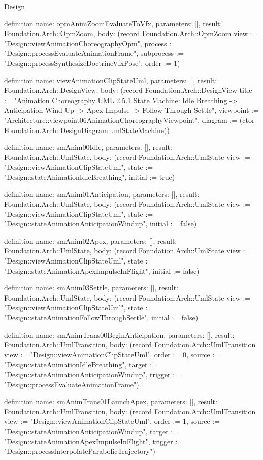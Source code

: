 \begin{lexlean}{Design}
\begin{semanticmodule}
definition{
  name: opmAnimZoomEvaluateToVfx,
  parameters: [],
  result: Foundation.Arch::OpmZoom,
  body: (record Foundation.Arch::OpmZoom {view := "Design::viewAnimationChoreographyOpm", process := "Design::processEvaluateAnimationFrame", subprocess := "Design::processSynthesizeDoctrineVfxPose", order := 1})
}

definition{
  name: viewAnimationClipStateUml,
  parameters: [],
  result: Foundation.Arch::DesignView,
  body: (record Foundation.Arch::DesignView {title := "Animation Choreography UML 2.5.1 State Machine: Idle Breathing -> Anticipation Wind-Up -> Apex Impulse -> Follow-Through Settle", viewpoint := "Architecture::viewpoint06AnimationChoreographyViewpoint", diagram := (ctor Foundation.Arch::DesignDiagram.umlStateMachine)})
}

definition{
  name: smAnim00Idle,
  parameters: [],
  result: Foundation.Arch::UmlState,
  body: (record Foundation.Arch::UmlState {view := "Design::viewAnimationClipStateUml", state := "Design::stateAnimationIdleBreathing", initial := true})
}

definition{
  name: smAnim01Anticipation,
  parameters: [],
  result: Foundation.Arch::UmlState,
  body: (record Foundation.Arch::UmlState {view := "Design::viewAnimationClipStateUml", state := "Design::stateAnimationAnticipationWindup", initial := false})
}

definition{
  name: smAnim02Apex,
  parameters: [],
  result: Foundation.Arch::UmlState,
  body: (record Foundation.Arch::UmlState {view := "Design::viewAnimationClipStateUml", state := "Design::stateAnimationApexImpulseInFlight", initial := false})
}

definition{
  name: smAnim03Settle,
  parameters: [],
  result: Foundation.Arch::UmlState,
  body: (record Foundation.Arch::UmlState {view := "Design::viewAnimationClipStateUml", state := "Design::stateAnimationFollowThroughSettle", initial := false})
}

definition{
  name: smAnimTrans00BeginAnticipation,
  parameters: [],
  result: Foundation.Arch::UmlTransition,
  body: (record Foundation.Arch::UmlTransition {view := "Design::viewAnimationClipStateUml", order := 0, source := "Design::stateAnimationIdleBreathing", target := "Design::stateAnimationAnticipationWindup", trigger := "Design::processEvaluateAnimationFrame"})
}

definition{
  name: smAnimTrans01LaunchApex,
  parameters: [],
  result: Foundation.Arch::UmlTransition,
  body: (record Foundation.Arch::UmlTransition {view := "Design::viewAnimationClipStateUml", order := 1, source := "Design::stateAnimationAnticipationWindup", target := "Design::stateAnimationApexImpulseInFlight", trigger := "Design::processInterpolateParabolicTrajectory"})
}


\end{semanticmodule}
\end{lexlean}
